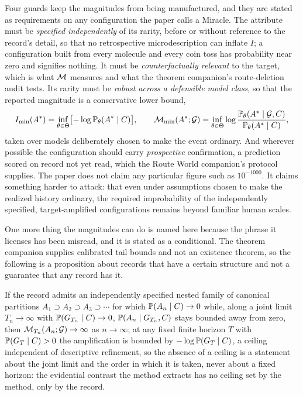 Four guards keep the magnitudes from being manufactured, and they are
stated as requirements on any configuration the paper calls a Miracle.
The attribute must be \emph{specified independently} of its rarity,
before or without reference to the record's detail, so that no
retrospective microdescription can inflate $I$; a configuration built
from every molecule and every coin toss has probability near zero and
signifies nothing. It must be \emph{counterfactually relevant} to the
target, which is what $\mathcal{M}$ measures and what the theorem companion's
route-deletion audit tests. Its rarity must be \emph{robust across a
defensible model class}, so that the reported magnitude is a
conservative lower bound,
\[
I_{\min}(A^\ast)=\inf_{\theta\in\Theta}\bigl[-\log\mathbb{P}_\theta(A^\ast\mid C)\bigr],
\qquad
\mathcal{M}_{\min}(A^\ast;\mathcal{G})=\inf_{\theta\in\Theta}\log\frac{\mathbb{P}_\theta(A^\ast\mid\mathcal{G},C)}{\mathbb{P}_\theta(A^\ast\mid C)},
\]
taken over models deliberately chosen to make the event ordinary. And
wherever possible the configuration should carry \emph{prospective}
confirmation, a prediction scored on record not yet read, which the
Route World companion's protocol supplies. The paper does not claim any
particular figure such as $10^{-1000}$. It claims something harder to
attack: that even under assumptions chosen to make the realized history
ordinary, the required improbability of the independently specified,
target-amplified configurations remains beyond familiar human scales.

One more thing the magnitudes can do is named here because the phrase
it licenses has been misread, and it is stated as a conditional. The
theorem companion supplies calibrated tail bounds and not an existence
theorem, so the following is a proposition about records that have a
certain structure and not a guarantee that any record has it.

\begin{proposition}\label{prop:nested}
If the record admits an independently specified nested family of
canonical partitions $A_1\supset A_2\supset A_3\supset\cdots$ for which $\mathbb{P}(A_n \mid C) \to 0$ while, along a joint limit $T_n \to \infty$ with $\mathbb{P}(G_{T_n} \mid C) \to 0$, $\mathbb{P}(A_n \mid G_{T_n}, C)$ stays bounded away from zero, then $\mathcal{M}_{T_n}(A_n;\mathcal{G}) \to \infty$ as $n \to \infty$; at any fixed finite horizon $T$ with $\mathbb{P}(G_T \mid C) > 0$ the amplification is bounded by $-\log \mathbb{P}(G_T \mid C)$, a ceiling independent of descriptive refinement, so the absence of a ceiling is a statement about the joint limit and the order in which it is taken, never about a fixed horizon:
the evidential contrast the method extracts has no ceiling set by the
method, only by the record.
\end{proposition}

